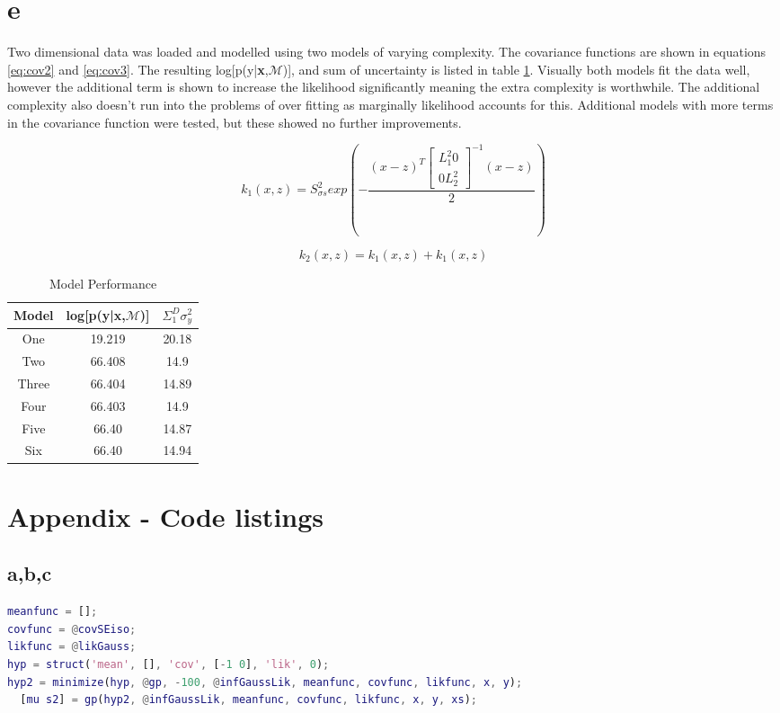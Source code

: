 \documentclass[twoside,twocolumn]{article}
\begin{document}
\section{e}
Two dimensional data was loaded and modelled using two models of varying complexity. The covariance functions are shown in equations \ref{eq:cov2} and \ref{eq:cov3}. The resulting log[p(y|\textbf{x},$\mathcal{M}$)], and sum of uncertainty is listed in table \ref{table:2d}. Visually both models  fit the data well, however the additional term is shown to increase the likelihood significantly meaning the extra complexity is worthwhile. The additional complexity also doesn't run into the problems of over fitting as marginally likelihood accounts for this. Additional models with more terms in the covariance function were tested, but these showed no further improvements. 

\begin{equation}
k_1(x,z)= S_{\sigma s}^2 exp(-\frac{(x-z)^T
\begin{bmatrix}
L_1^2 0 \\
0 L_2^2
\end{bmatrix}^{-1}
(x-z)}{2})
\label{eq:cov2}
\end{equation}

\begin{equation}
k_2(x,z)= k_1(x,z) + k_1(x,z)
\label{eq:cov3}
\end{equation}

\begin{table}[h]
\centering
\begin{tabular}{ c | c | c }
Model&log[p(y|\textbf{x},$\mathcal{M}$)]&$\Sigma_1^D \sigma_y^2$\\ 

\midrule
One&19.219&20.18\\
Two&66.408&14.9\\
Three&66.404&14.89 \\
Four&66.403&14.9\\
Five&66.40&14.87\\
Six&66.40&14.94\\


\end{tabular}
\caption{Model Performance}
\label{table:2d}
\end{table}
\section{Appendix - Code listings}
\subsection{a,b,c}
\begin{lstlisting}[language=matlab]
meanfunc = [];                     
covfunc = @covSEiso;              
likfunc = @likGauss;              
hyp = struct('mean', [], 'cov', [-1 0], 'lik', 0);
hyp2 = minimize(hyp, @gp, -100, @infGaussLik, meanfunc, covfunc, likfunc, x, y);
  [mu s2] = gp(hyp2, @infGaussLik, meanfunc, covfunc, likfunc, x, y, xs);
\end{lstlisting}
\end{document}
